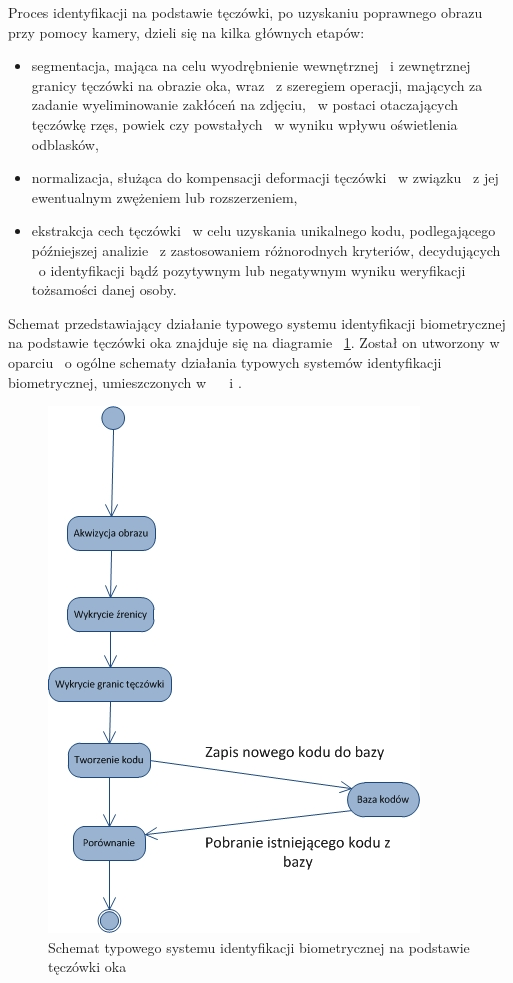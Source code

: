 Proces identyfikacji na podstawie tęczówki, po uzyskaniu poprawnego obrazu przy pomocy kamery, dzieli się na kilka głównych etapów: \begin{itemize}
\item segmentacja, mająca na celu wyodrębnienie wewnętrznej ~i zewnętrznej granicy tęczówki na obrazie oka, wraz ~z szeregiem operacji, mających za zadanie wyeliminowanie zakłóceń na zdjęciu, ~w postaci otaczających tęczówkę rzęs, powiek czy powstałych ~w wyniku wpływu oświetlenia odblasków,
\item normalizacja, służąca do kompensacji deformacji tęczówki ~w związku ~z jej ewentualnym zwężeniem lub rozszerzeniem,
\item ekstrakcja cech tęczówki ~w celu uzyskania unikalnego kodu, podlegającego późniejszej analizie ~z zastosowaniem różnorodnych kryteriów, decydujących ~o identyfikacji bądź pozytywnym lub negatywnym wyniku weryfikacji tożsamości danej osoby.
\end{itemize}

Schemat przedstawiający działanie typowego systemu identyfikacji biometrycznej na podstawie tęczówki oka znajduje się na diagramie ~\ref{fig:identyfikacja}. Został on utworzony w oparciu ~o ogólne schematy działania typowych systemów identyfikacji biometrycznej, umieszczonych w ~\cite{Bio02} ~i \cite{Jain00}.
\begin{figure}[b]
\begin{center}
\includegraphics{schemat.jpg}
\caption{Schemat typowego systemu identyfikacji biometrycznej na podstawie tęczówki oka}
\label{fig:identyfikacja}
\end{center}
\end{figure}

